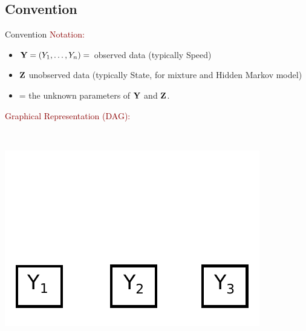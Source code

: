 \documentclass{beamer}\usepackage[]{graphicx}\usepackage[]{color}
\newcommand{\emphase}[1]{\textcolor{darkred}{#1}}
\newcommand{\paragraph}[1]{\emphase{#1}}
\newcommand{\Ybf}{{\bf Y}}
\newcommand{\Zbf}{{\bf Z}}
\newcommand{\thetabf}{\mbox{\mathversion{bold}{$\theta$}}}
\begin{document}
\subsection*{Convention}


\begin{frame}{Convention}
\paragraph{Notation:}
{\small
\begin{itemize}
\item $\Ybf = (Y_1, \ldots, Y_n) = $ observed data (typically Speed)
 \item $\Zbf $ unobserved data (typically State, for mixture  and Hidden Markov model)
 \item \thetabf = the unknown parameters of $\Ybf$ and $\Zbf$.
\end{itemize}
}
\pause
\paragraph{Graphical Representation (DAG):}  \medskip
\begin{columns}
\begin{column}{0.3\textwidth}
\\ \smallskip
\includegraphics[scale=0.4]{Dag1.pdf}
\end{column}
\pause



\end{columns}
\end{frame}
\end{document}
